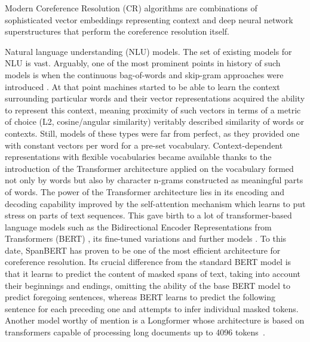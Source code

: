 Modern Coreference Resolution (CR) algorithms are combinations of sophisticated vector embeddings representing context and deep neural network superstructures that perform the coreference resolution itself. 

Natural language understanding (NLU) models. 
The set of existing models for NLU is vast. 
Arguably, one of the most prominent points in history of such models is when the continuous bag-of-words and skip-gram approaches were introduced \cite{w2v-Mikolov2013}. 
At that point machines started to be able to learn the context surrounding particular words and their vector representations  acquired the ability to represent this context, meaning proximity of such vectors in terms of a metric of choice (L2, cosine/angular similarity) veritably described similarity of words or contexts. 
Still, models of these types were far from perfect, as they provided one with constant vectors per word for a pre-set vocabulary. 
Context-dependent representations with flexible vocabularies became available thanks to the introduction of the Transformer architecture \cite{transformer-Vaswani2017} applied on the vocabulary formed not only by words but also by character n-grams constructed as meaningful parts of words.  
The power of the Transformer architecture lies in its encoding and decoding capability improved by the self-attention mechanism which learns to put stress on parts of text sequences. 
This gave birth to a lot of transformer-based language models such as the Bidirectional Encoder Representations from Transformers (BERT) \cite{bert-Devlin2019}, its fine-tuned variations \cite{albert-Lan2020,robarta-Liu2019} and further models \cite{gpt-Radford2018,use-Cer2018}. 
To this date, SpanBERT \cite{cr-Joshi2019} has proven to be one of the most efficient architecture for coreference resolution. 
Its crucial difference from the standard BERT model is that it learns to predict the content of masked spans of text, taking into account their beginnings and endings, omitting the ability of the base BERT model to predict foregoing  sentences, whereas BERT learns to predict the following sentence for each preceding one and attempts to infer individual masked tokens.
Another model worthy of mention is a Longformer whose architecture is based on transformers capable of processing long documents up to 4096 tokens~\cite{Beltagy2020Longformer}.


